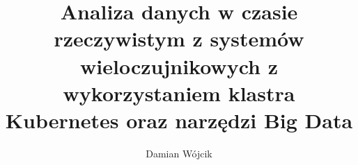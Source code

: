 \documentclass[12pt]{przejsciowka}
\title{Analiza danych w czasie rzeczywistym z systemów wieloczujnikowych z wykorzystaniem klastra Kubernetes oraz narzędzi Big Data}
\author{Damian Wójcik}
\newcommand{\inputcleanchapter}[1]{%
    \begingroup
    
    \endgroup
}
\begin{document}
    \renewcommand\lstlistingname{Listing}
    \renewcommand\lstlistlistingname{Listing}

    \maketitle
    \tableofcontents
    \clearpage

    \inputcleanchapter{abstract_pl}
    \clearpage

    \inputcleanchapter{abstract_en}
    \clearpage


    \inputcleanchapter{rozdzial1_wprowadzenie}
    \clearpage


    \inputcleanchapter{rozdzial2_przeglad_literatury}
    \clearpage


    \inputcleanchapter{rozdzial3_projekt_systemu}
    \clearpage

    \inputcleanchapter{rozdzial10_funkcje_biznesowe}
    \clearpage

    \inputcleanchapter{rozdzial4_implementacja_systemu}
    \clearpage
    
    \inputcleanchapter{rozdzial5_algorytmy_analizy}
    \clearpage
    
    \inputcleanchapter{rozdzial9_generator_danych}
    \clearpage

    \inputcleanchapter{rozdzial11_konfiguracja_kubernetes}
    \clearpage

    \inputcleanchapter{rozdzial12_autoryzacja}
    \clearpage

    \inputcleanchapter{rozdzial13_ewolucja_rozwiazania}
    \clearpage

    \inputcleanchapter{rozdzial7_zastosowania}
    \clearpage
 
    \inputcleanchapter{rozdzial8_podsumowanie}
    \clearpage

    
    \clearpage

    \listoffigures
    \clearpage

    \listoftables
    \clearpage

    \lstlistoflistings
    \clearpage
\end{document}
